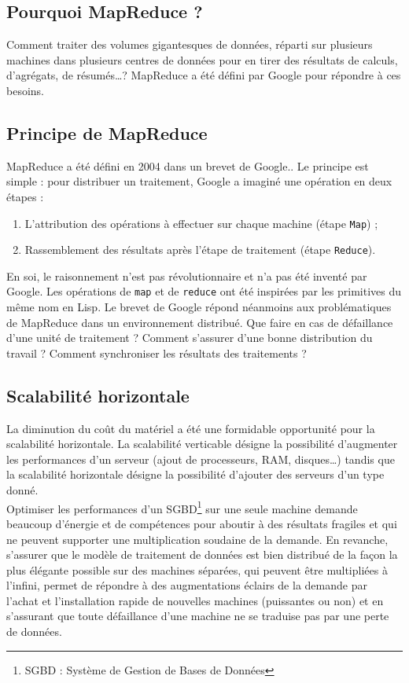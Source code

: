 \subsection{Pourquoi MapReduce ?}
	Comment traiter des volumes gigantesques de données, réparti sur plusieurs machines dans plusieurs centres de données pour en tirer des résultats de calculs, d'agrégats, de résumés\dots ? MapReduce a été défini par Google pour répondre à ces besoins.

\subsection{Principe de MapReduce}
	MapReduce a été défini en 2004 dans un brevet de Google.\cite{google_mapreduce}. Le principe est simple : pour distribuer un traitement, Google a imaginé une opération en deux étapes :
	\begin{enumerate}
		\item L'attribution des opérations à effectuer sur chaque machine (étape \texttt{Map}) ;
		\item Rassemblement des résultats après l'étape de traitement (étape \texttt{Reduce}).
	\end{enumerate}

	En soi, le raisonnement n'est pas révolutionnaire et n'a pas été inventé par Google. Les opérations de \texttt{map} et de \texttt{reduce} ont été inspirées par les primitives du même nom en Lisp. Le brevet de Google répond néanmoins aux problématiques de MapReduce dans un environnement distribué. Que faire en cas de défaillance d'une unité de traitement ? Comment s'assurer d'une bonne distribution du travail ? Comment synchroniser les résultats des traitements ?

\subsection{Scalabilité horizontale}
	La diminution du coût du matériel a été une formidable opportunité pour la scalabilité horizontale. La scalabilité verticable désigne la possibilité d'augmenter les performances d'un serveur (ajout de processeurs, RAM, disques\dots) tandis que la scalabilité horizontale désigne la possibilité d'ajouter des serveurs d'un type donné.\cite{Wikipedia_scalabilite}\\

	Optimiser les performances d'un SGBD\footnote{SGBD : Système de Gestion de Bases de Données} sur une seule machine demande beaucoup d'énergie et de compétences pour aboutir à des résultats fragiles et qui ne peuvent supporter une multiplication soudaine de la demande. En revanche, s'assurer que le modèle de traitement de données est bien distribué de la façon la plus élégante possible sur des machines séparées, qui peuvent être multipliées à l'infini, permet de répondre à des augmentations éclairs de la demande par l'achat et l'installation rapide de nouvelles machines (puissantes ou non) et en s'assurant que toute défaillance d'une machine ne se traduise pas par une perte de données.\\

